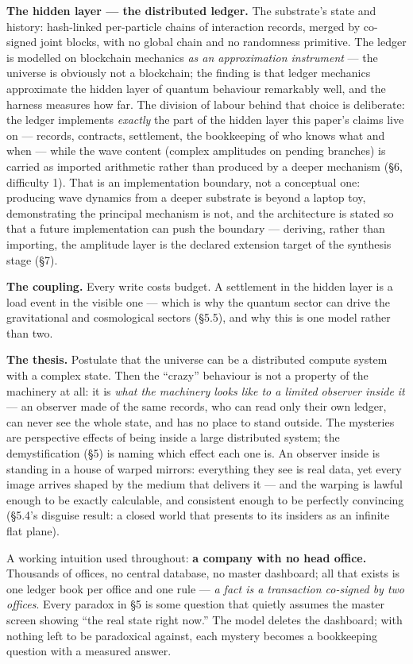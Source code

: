 \documentclass[
  11pt,
]{article}
\begin{document}
\textbf{The hidden layer --- the distributed ledger.} The substrate's
state and history: hash-linked per-particle chains of interaction
records, merged by co-signed joint blocks, with no global chain and no
randomness primitive. The ledger is modelled on blockchain mechanics
\emph{as an approximation instrument} --- the universe is obviously not
a blockchain; the finding is that ledger mechanics approximate the
hidden layer of quantum behaviour remarkably well, and the harness
measures how far. The division of labour behind that choice is
deliberate: the ledger implements \emph{exactly} the part of the hidden
layer this paper's claims live on --- records, contracts, settlement,
the bookkeeping of who knows what and when --- while the wave content
(complex amplitudes on pending branches) is carried as imported
arithmetic rather than produced by a deeper mechanism (\S{}6, difficulty
1). That is an implementation boundary, not a conceptual one: producing
wave dynamics from a deeper substrate is beyond a laptop toy,
demonstrating the principal mechanism is not, and the architecture is
stated so that a future implementation can push the boundary ---
deriving, rather than importing, the amplitude layer is the declared
extension target of the synthesis stage (\S{}7).

\textbf{The coupling.} Every write costs budget. A settlement in the
hidden layer is a load event in the visible one --- which is why the
quantum sector can drive the gravitational and cosmological sectors
(\S{}5.5), and why this is one model rather than two.

\textbf{The thesis.} Postulate that the universe can be a distributed
compute system with a complex state. Then the ``crazy'' behaviour is not
a property of the machinery at all: it is \emph{what the machinery looks
like to a limited observer inside it} --- an observer made of the same
records, who can read only their own ledger, can never see the whole
state, and has no place to stand outside. The mysteries are perspective
effects of being inside a large distributed system; the demystification
(\S{}5) is naming which effect each one is. An observer inside is standing
in a house of warped mirrors: everything they see is real data, yet
every image arrives shaped by the medium that delivers it --- and the
warping is lawful enough to be exactly calculable, and consistent enough
to be perfectly convincing (\S{}5.4's disguise result: a closed world that
presents to its insiders as an infinite flat plane).

A working intuition used throughout: \textbf{a company with no head
office.} Thousands of offices, no central database, no master dashboard;
all that exists is one ledger book per office and one rule --- \emph{a
fact is a transaction co-signed by two offices}. Every paradox in \S{}5 is
some question that quietly assumes the master screen showing ``the real
state right now.'' The model deletes the dashboard; with nothing left to
be paradoxical against, each mystery becomes a bookkeeping question with
a measured answer.
\end{document}
